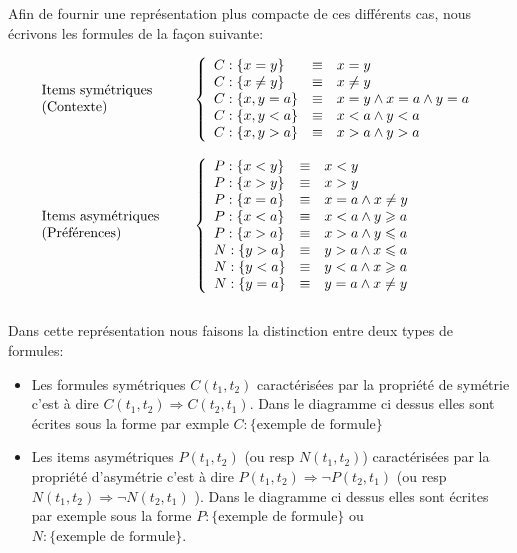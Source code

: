\documentclass[a4paper,12pt,openany,oneside]{article}
\begin{document}
Afin de fournir une représentation plus compacte de ces différents cas, nous écrivons les formules de la façon suivante:




 
       \[
       \begin{array}{l l}
       \parbox{3.5cm}{Items symétriques\\ (Contexte)}&
 	  \left\{
 		  \begin{array}{l c l}
 		     C:\{x=y\}&\equiv& x=y\\
 		     C:\{x\neq y\}&\equiv& x\neq y\\
 		   	 C:\{x,y=a\}&\equiv& x=y\wedge x=a\wedge y=a\\
 		   	 C:\{x,y<a\}&\equiv& x<a\wedge y<a\\
 		   	 C:\{x,y>a\}&\equiv& x>a\wedge y>a
 	   	 \end{array}
    	 \right.\\
 	&\\
       \parbox{3.5cm}{Items asymétriques\\ (Préférences)}&
 	  \left\{
 		  \begin{array}{l c l}   	 
 		   	 P:\{x<y\}&\equiv& x<y\\
 		   	 P:\{x>y\}&\equiv& x>y\\
 		   	 P:\{x=a\} &\equiv& x=a \wedge x\neq y \\
 		   	 P:\{x<a\} &\equiv& x<a \wedge y\geqslant a\\
 			 P:\{x>a\} &\equiv& x>a \wedge y\leqslant a\\
 			 
 			 N:\{y>a\} &\equiv& y>a \wedge x\leqslant a\\
 			 N:\{y<a\} &\equiv& y<a \wedge x\geqslant a\\
 		   	 N:\{y=a\} &\equiv& y=a \wedge x\neq y\\	 
 	   	 \end{array}
    	 \right.
    	 \end{array}
    	 \]		   	 	 		\\ 

Dans cette représentation nous faisons la distinction entre deux types de formules:\\

\begin{itemize}
	\item Les formules symétriques $C(t_1,t_2)$ caractérisées par la propriété de symétrie c'est à dire  $C(t_1,t_2)\Rightarrow  C(t_2,t_1)$. Dans le diagramme ci dessus elles sont écrites sous la forme par exmple $C:\{\text{exemple de formule}\}$
	\item Les items asymétriques $P(t_1,t_2)$ (ou resp $N(t_1,t_2)$) caractérisées par la propriété d'asymétrie c'est à dire $P(t_1,t_2)\Rightarrow \neg P(t_2,t_1)$ (ou resp $N(t_1,t_2)\Rightarrow \neg N(t_2,t_1)$ ). Dans le diagramme ci dessus elles sont écrites par exemple sous la forme $P:\{\text{exemple de formule}\}$ ou $N:\{\text{exemple de formule}\}$.
\end{itemize}
\end{document}
